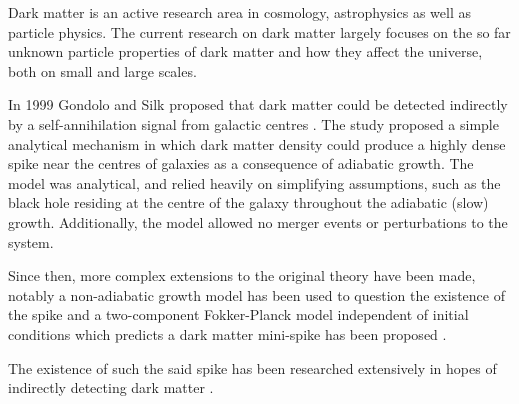 \documentclass[12pt]{article}
\begin{document}








Dark matter is an active research area in cosmology, astrophysics as well as particle physics. 
The current research on dark matter largely focuses on the so far 
unknown particle properties of dark matter and how they affect the universe, 
both on small and large scales. %

In 1999 Gondolo and Silk proposed that dark matter could be detected 
indirectly by a self-annihilation signal from galactic centres \citep{GS_1999}. %
The study proposed a simple analytical mechanism in which dark matter density could produce a highly dense spike near the centres of galaxies 
as a consequence of adiabatic growth. The model was analytical, and relied heavily on simplifying assumptions, such as the black hole residing 
at the centre of the galaxy throughout the adiabatic (slow) growth. Additionally, 
the model allowed no merger events or perturbations to the system.%

Since then, more complex extensions to the original theory have been made, notably a non-adiabatic 
growth model \citep{ullio2001spike_criticism} has been used to 
question the existence of the spike and a two-component Fokker-Planck model independent 
of initial conditions which predicts a dark matter mini-spike 
has been proposed \citep{gnedin_primack_2004}.


The existence of such the said spike has been researched extensively in hopes of 
indirectly detecting dark matter \citep{gondolo2000dmsearch,bertone2001dmsearch,fields2014galactic}. %
\end{document}

